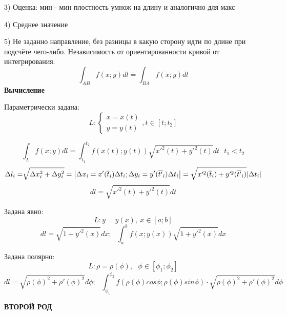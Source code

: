 \documentclass{article}
\begin{document}
3) Оценка: мин - мин плостность умнож на длину и аналогично для макс 

4) Среднее значение

5) Не заданно направление, без разницы в какую сторону идти по длине при подсчёте чего-либо. Независимость от ориентированности кривой от интегрирования.
\begin{equation*}
    \int_{AB}^{} f(x;y)dl = \int_{BA}^{} f(x;y)dl
\end{equation*}
\textbf{Вычисление}

Параметрически задана:
\begin{equation*}
    L:
    \begin{cases}
        x=x(t)\\
        y=y(t)
    \end{cases},t\in[ t;t_2]
\end{equation*}

\begin{equation*}
    \int_{L}^{}f(x;y)dl = \int_{t_1}^{t_2}f(x(t);y(t))\sqrt{x'^2(t)+y'^2(t)}dt\ \ \ t_1<t_2
\end{equation*}
\begin{equation*}
    \Delta l_i = \sqrt[]{\Delta x_i^2+\Delta y_i^2}=\left|\Delta x_i = x'(\overline{t}_i)\Delta t_i; \Delta y_i = y'(\overline{t'}_i)\Delta t_i\right| = 
    \sqrt{x'^2(\overline{t}_i)+y'^2(\overline{t'}_i)}\abs{\Delta t_i}
\end{equation*}
\begin{equation*}
    dl = \sqrt{x'^2(t)+y'^2(t)}dt
\end{equation*}

Задана явно:
\begin{equation*}
    L: y=y(x),\ x\in [a;b]
\end{equation*}
\begin{equation*}
    dl = \sqrt{1+y'^2(x)}dx;\ \ \ \int_{a}^{b}f(x; y(x))\sqrt{1+y'^2(x)}dx
\end{equation*}

Задана полярно:
\begin{equation*}
    L: \rho = \rho(\phi),\ \ \ \phi \in [\phi_1;\phi_2]
\end{equation*}
\begin{equation*}
    dl = \sqrt{\rho(\phi)^2+\rho'(\phi)^2}d\phi; \ \ \ \int_{\phi_1}^{\phi_2}f(\rho(\phi) cos\phi;\rho(\phi)sin\phi)\cdot \sqrt{\rho(\phi)^2+\rho'(\phi)^2}d\phi
\end{equation*}

\textbf{ВТОРОЙ РОД}
\end{document}
